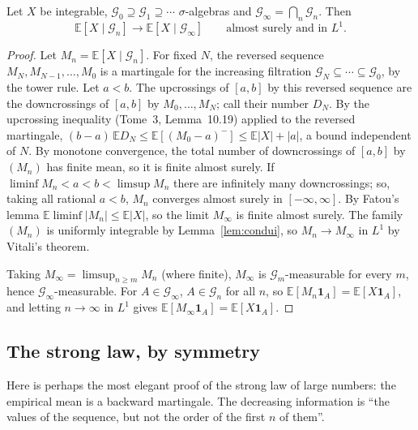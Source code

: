 \begin{theorem}\label{thm:levydown}
Let $X$ be integrable, $\mathcal G_0\supseteq\mathcal G_1\supseteq\cdots$ $\sigma$-algebras and $\mathcal G_\infty=\bigcap_n\mathcal G_n$. Then
\[
\mathbb E[X\mid\mathcal G_n]\longrightarrow\mathbb E[X\mid\mathcal G_\infty]\qquad\text{almost surely and in }L^1.
\]
\end{theorem}
\begin{proof}
Let $M_n=\mathbb E[X\mid\mathcal G_n]$. For fixed $N$, the reversed sequence $M_N,M_{N-1},\dots,M_0$ is a martingale for the increasing filtration $\mathcal G_N\subseteq\cdots\subseteq\mathcal G_0$, by the tower
rule. Let $a<b$. The upcrossings of $[a,b]$ by this reversed sequence are the downcrossings of $[a,b]$ by $M_0,\dots,M_N$; call their number $D_N$. By the upcrossing inequality (Tome~3, Lemma~10.19) applied
to the reversed martingale, $(b-a)\,\mathbb ED_N\le\mathbb E[(M_0-a)^-]\le\mathbb E|X|+|a|$, a bound independent of $N$. By monotone convergence, the total number of downcrossings of $[a,b]$ by $(M_n)$ has finite mean, so it is
finite almost surely. If $\liminf M_n<a<b<\limsup M_n$ there are infinitely many downcrossings; so, taking all rational $a<b$, $M_n$ converges almost surely in $[-\infty,\infty]$. By Fatou's lemma
$\mathbb E\liminf|M_n|\le\mathbb E|X|$, so the limit $M_\infty$ is finite almost surely. The family $(M_n)$ is uniformly integrable by Lemma~\ref{lem:condui}, so $M_n\to M_\infty$ in $L^1$ by Vitali's theorem.

Taking $M_\infty=\limsup_{n\ge m}M_n$ (where finite), $M_\infty$ is $\mathcal G_m$-measurable for every $m$, hence $\mathcal G_\infty$-measurable. For $A\in\mathcal G_\infty$, $A\in\mathcal G_n$ for all $n$, so
$\mathbb E[M_n\mathbf 1_A]=\mathbb E[X\mathbf 1_A]$, and letting $n\to\infty$ in $L^1$ gives $\mathbb E[M_\infty\mathbf 1_A]=\mathbb E[X\mathbf 1_A]$.
\end{proof}

\subsection*{The strong law, by symmetry}

Here is perhaps the most elegant proof of the strong law of large numbers: the empirical mean is a backward martingale. The decreasing information is ``the values of the sequence, but not
the order of the first $n$ of them''.

